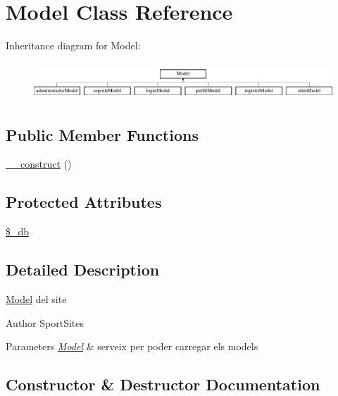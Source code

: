 \hypertarget{class_model}{}\section{Model Class Reference}
\label{class_model}
Inheritance diagram for Model\+:\begin{figure}[H]
\begin{center}
\leavevmode
\includegraphics[height=1.424936cm]{class_model}
\end{center}
\end{figure}
\subsection*{Public Member Functions}
\begin{DoxyCompactItemize}
\item 
\hyperlink{class_model_a095c5d389db211932136b53f25f39685}{\+\_\+\+\_\+construct} ()
\end{DoxyCompactItemize}
\subsection*{Protected Attributes}
\begin{DoxyCompactItemize}
\item 
\hyperlink{class_model_abc686c23af6ae116b72bc6adb4482a1f}{\$\+\_\+db}
\end{DoxyCompactItemize}


\subsection{Detailed Description}
\hyperlink{class_model}{Model} del site

\begin{DoxyAuthor}{Author}
Sport\+Sites 
\end{DoxyAuthor}

\begin{DoxyParams}{Parameters}
{\em \hyperlink{class_model}{Model}} & serveix per poder carregar els models \\
\hline
\end{DoxyParams}


\subsection{Constructor \& Destructor Documentation}
\hypertarget{class_model_a095c5d389db211932136b53f25f39685}{}
